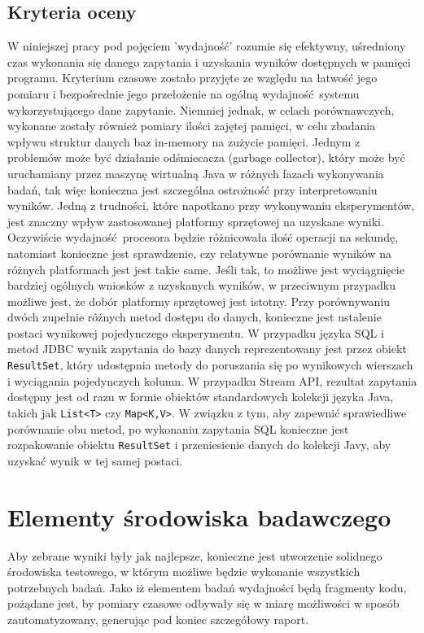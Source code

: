 \documentclass[12pt]{extarticle}
\begin{document}
\subsection{Kryteria oceny}

    W niniejszej pracy pod pojęciem 'wydajność' rozumie się efektywny, uśredniony czas wykonania się danego zapytania i uzyskania wyników dostępnych w pamięci programu. Kryterium czasowe zostało przyjęte ze względu na łatwość jego pomiaru i bezpośrednie jego przełożenie na ogólną wydajność systemu wykorzystującego dane zapytanie. Niemniej jednak, w celach porównawczych, wykonane zostały również pomiary ilości zajętej pamięci, w celu zbadania wpływu struktur danych baz in-memory na zużycie pamięci. Jednym z problemów może być działanie odśmiecacza (garbage collector), który może być uruchamiany przez maszynę wirtualną Java w różnych fazach wykonywania badań, tak więc konieczna jest szczególna ostrożność przy interpretowaniu wyników.
    Jedną z trudności, które napotkano przy wykonywaniu eksperymentów, jest znaczny wpływ zastosowanej platformy sprzętowej na uzyskane wyniki. Oczywiście wydajność procesora będzie różnicowała ilość operacji na sekundę, natomiast konieczne jest sprawdzenie, czy relatywne porównanie wyników na różnych platformach jest jest takie same. Jeśli tak, to możliwe jest wyciągnięcie bardziej ogólnych wniosków z uzyskanych wyników, w przeciwnym przypadku możliwe jest, że dobór platformy sprzętowej jest istotny.
    Przy porównywaniu dwóch zupełnie różnych metod dostępu do danych, konieczne jest ustalenie postaci wynikowej pojedynczego eksperymentu. W przypadku języka SQL i metod JDBC wynik zapytania do bazy danych reprezentowany jest przez obiekt \texttt{ResultSet}, który udostępnia metody do poruszania się po wynikowych wierszach i wyciągania pojedynczych kolumn. W przypadku Stream API, rezultat zapytania dostępny jest od razu w formie obiektów standardowych kolekcji języka Java, takich jak \texttt{List<T>} czy \texttt{Map<K,V>}. W związku z tym, aby zapewnić sprawiedliwe porównanie obu metod, po wykonaniu zapytania SQL konieczne jest rozpakowanie obiektu \texttt{ResultSet} i przeniesienie danych do kolekcji Javy, aby uzyskać wynik w tej samej postaci.

\section{Elementy środowiska badawczego}

    Aby zebrane wyniki były jak najlepsze, konieczne jest utworzenie solidnego środowiska testowego, w którym możliwe będzie wykonanie wszystkich potrzebnych badań. Jako iż elementem badań wydajności będą fragmenty kodu, pożądane jest, by pomiary czasowe odbywały się w miarę możliwości w sposób zautomatyzowany, generując pod koniec szczegółowy raport.
\end{document}
